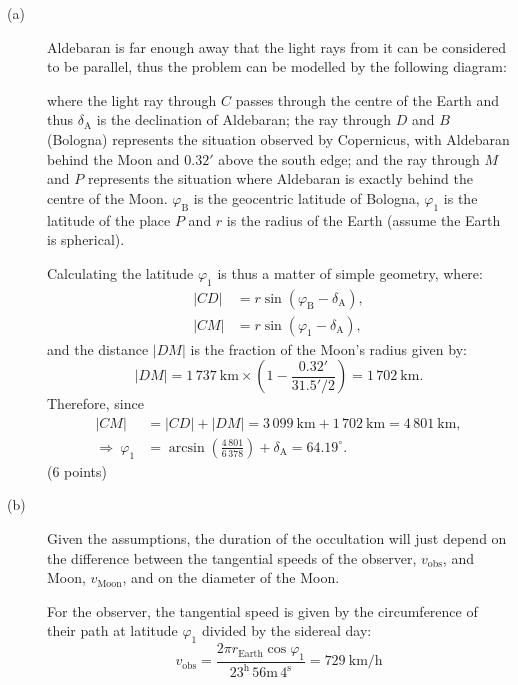 \begin{description}
\item[(a)] Aldebaran is far enough away that the light rays from it can be
  considered to be parallel, thus the problem can be modelled by the following
  diagram:


  where the light ray through $C$ passes through the centre of the Earth and
  thus $\delta_{\mathrm{A}}$ is the declination of Aldebaran; the ray through
  $D$ and $B$ (Bologna) represents the situation observed by Copernicus, with
  Aldebaran behind the Moon and $0.32'$ above the south edge; and the ray
  through $M$ and $P$ represents the situation where Aldebaran is exactly
  behind the centre of the Moon. $\varphi_{\mathrm{B}}$ is the geocentric
  latitude of Bologna, $\varphi_1$ is the latitude of the place $P$ and $r$ is
  the radius of the Earth (assume the Earth is spherical).

  Calculating the latitude $\varphi_1$ is thus a matter of simple geometry,
  where:
  \begin{align*}
    |CD| &= r\sin(\varphi_{\mathrm{B}} - \delta_{\mathrm{A}}),\\
    |CM| &= r\sin(\varphi_1 - \delta_{\mathrm{A}}),
  \end{align*}
  and the distance $|DM|$ is the fraction of the Moon's radius given by:
  \[
    |DM| = 1\,737\ \mathrm{km} \times
      \left(1 - \frac{0.32'}{31.5'/2}\right) = 1\,702\ \mathrm{km}.
  \]
  Therefore, since
  \begin{align*}
    |CM| &= |CD| + |DM| = 3\,099\ \mathrm{km} + 1\,702\ \mathrm{km}
          = 4\,801\ \mathrm{km},\\
    \Longrightarrow\ \varphi_1 &= \arcsin\left(\frac{4\,801}{6\,378}\right)
      + \delta_{\mathrm{A}} = 64.19^\circ.
  \end{align*}
  \hfill(6 points)

\item[(b)] Given the assumptions, the duration of the occultation will just
  depend on the difference between the tangential speeds of the observer,
  $v_{\mathrm{obs}}$, and Moon, $v_{\mathrm{Moon}}$, and on the diameter of
  the Moon.

  For the observer, the tangential speed is given by the circumference of
  their path at latitude $\varphi_1$ divided by the sidereal day:
  \[
    v_{\mathrm{obs}} = \frac{2\pi r_{\mathrm{Earth}} \cos\varphi_1}
                            {23^{\mathrm{h}}\,56\mathrm{m}\,4^{\mathrm{s}}}
                     = 729\ \mathrm{km/h}
  \]


\end{description}
